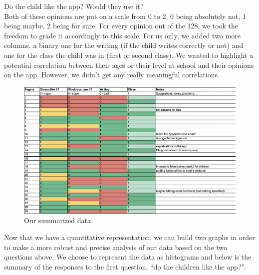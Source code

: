 \documentclass[12pt]{scrartcl}
\begin{document}
			Do the child like the app? Would they use it?\\

			Both of these opinions are put on a scale from 0 to 2, 0 being absolutely not, 1 being maybe, 2 being for sure. For every opinion out of the 128, we took the freedom to grade it accordingly to this scale. For us only, we added two more columns, a binary one for the writing (if the child writes correctly or not) and one for the class the child was in (first or second class). We wanted to highlight a potential correlation between their ages or their level at school and their opinions on the app. However, we didn't get any really meaningful correlations. 

			\begin{figure}[H]
                        		\centering
               			\includegraphics[width=\textwidth]{../images/image_1_data_analysis.png}
               			\caption{Our summarized data}
                        		\label{analysis1}
      			\end{figure}

			Now that we have a quantitative representation, we can build two graphs in order to make a more robust and precise analysis of our data based on the two questions above. We choose to represent the data as histograms and below is the summary of the responses to the first question, “do the children like the app?”.
\end{document}
